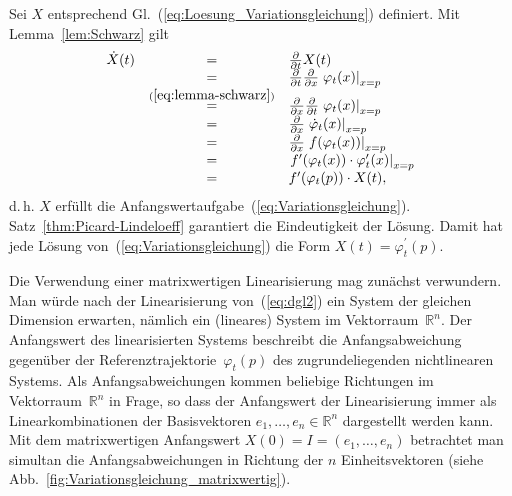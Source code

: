 \begin{svmultproof}
Sei $X$ entsprechend Gl.~(\ref{eq:Loesung_Variationsgleichung})
definiert. Mit Lemma~\ref{lem:Schwarz} gilt
\[
\begin{array}{ccl}
\dot{X}(t) & = & \frac{\partial}{\partial t}X(t)\\
 & = & \frac{\partial}{\partial t}\frac{\partial}{\partial x}\left.\varphi_{t}(x)\right|_{x=p}\\
 & \stackrel{(\ref{eq:lemma-schwarz})}{=} & \frac{\partial}{\partial x}\frac{\partial}{\partial t}\left.\varphi_{t}(x)\right|_{x=p}\\
 & = & \frac{\partial}{\partial x}\left.\dot{\varphi}_{t}(x)\right|_{x=p}\\
 & = & \frac{\partial}{\partial x}\left.f(\varphi_{t}(x))\right|_{x=p}\\
 & = & \left.f^{\prime}(\varphi_{t}(x))\cdot\varphi_{t}^{\prime}(x)\right|_{x=p}\\
 & = & f^{\prime}(\varphi_{t}(p))\cdot X(t),
\end{array}
\]
d.\,h. $X$ erfüllt die Anfangswertaufgabe~(\ref{eq:Variationsgleichung}).
Satz~\ref{thm:Picard-Lindeloeff} garantiert die Eindeutigkeit der
Lösung. Damit hat jede Lösung von~(\ref{eq:Variationsgleichung})
die Form $X(t)=\varphi_{t}^{\prime}(p)$.
\end{svmultproof}
Die Verwendung einer matrixwertigen Linearisierung mag zunächst verwundern.
Man würde nach der Linearisierung von~(\ref{eq:dgl2}) ein System
der gleichen Dimension erwarten, nämlich ein (lineares) System im
Vektorraum~${\mathbb{R}}^{n}$. Der Anfangswert des linearisierten Systems
beschreibt die Anfangsabweichung gegenüber der Referenztrajektorie~$\varphi_{t}(p)$
des zugrundeliegenden nichtlinearen Systems. Als Anfangsabweichungen
kommen beliebige Richtungen im Vektorraum~${\mathbb{R}}^{n}$ in Frage, so
dass der Anfangswert der Linearisierung immer als Linearkombinationen
der Basisvektoren $e_{1},\ldots,e_{n}\in{\mathbb{R}}^{n}$ dargestellt werden
kann. Mit dem matrixwertigen Anfangswert $X(0)=I=(e_{1},\ldots,e_{n})$
betrachtet man simultan die Anfangsabweichungen in Richtung der $n$
Einheitsvektoren (siehe Abb.~\ref{fig:Variationsgleichung_matrixwertig}).



